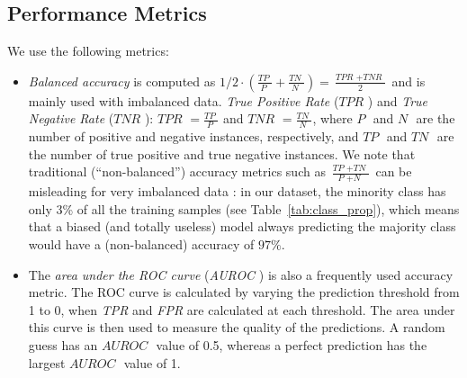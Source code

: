 \documentclass[accepted]{uai2021} %
\newcommand{\todo}[1]{{\color{red}{\textbf{TODO:}  #1}}}
\newcommand{\TP}{\textit{TP }}
\newcommand{\TN}{\textit{TN }}
\newcommand{\TPR}{\textit{TPR }}
\newcommand{\TNR}{\textit{TNR }}
\newcommand{\Pos}{\textit{P }}
\newcommand{\Neg}{\textit{N }}
\newcommand{\FPR}{\textit{FPR }}
\newcommand{\AUC}{\textit{AUROC }}
\begin{document}




\subsection{Performance Metrics}

We use the following metrics:
\begin{itemize}
    \label{sec:metrics}
    \item \emph{Balanced accuracy}  \citep{Balanced_acc_1,Balanced_acc_2} is computed as  $1/2 \cdot (\frac{\TP}{\Pos}+\frac{\TN}{\Neg}) = \frac{\TPR+\TNR}{2}$ and is mainly used with imbalanced data. \emph{True Positive Rate} ($\TPR$) and \emph{True Negative Rate} ($\TNR$):
    $\TPR=\frac{\TP}{\Pos}$ and $\TNR=\frac{\TN}{\Neg}$, where $\Pos$ and $\Neg$ are the number of positive and negative instances, respectively, and $\TP$ and $\TN$ are the number of true positive and true negative instances.
    We note that traditional (``non-balanced'') accuracy metrics such as $\frac{\TP+\TN}{\Pos+\Neg}$ can be misleading for very imbalanced data \cite{akosa2017predictive}: in our dataset, the minority class has only 3\% of all the training samples (see Table~\ref{tab:class_prop}), which means that a biased (and totally useless) model always predicting the majority class would have a (non-balanced) accuracy of  $97\%$. 
    \item The \emph{area under the ROC curve} (\AUC) is also a frequently used accuracy metric. The ROC curve is calculated by varying the prediction threshold from 1 to 0, when \TPR and \FPR are calculated at each threshold. The area under this curve is then used to measure the quality of the predictions. A random guess has an $\AUC$ value of 0.5, whereas a perfect prediction has the largest $\AUC$ value of 1.  
\end{itemize}
\end{document}

